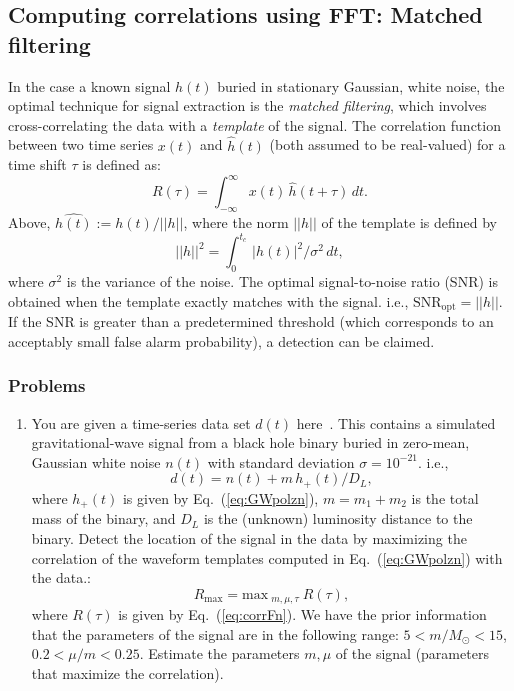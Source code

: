 \subsection{Computing correlations using FFT: Matched filtering}
In the case a known signal $h(t)$ buried in stationary Gaussian, white noise, the optimal technique for 
signal extraction is the \emph{matched filtering}, which involves cross-correlating the data 
with a \emph{template} of the signal. The correlation function between two time series $x(t)$ and $\hat h(t)$ (both assumed to be real-valued) for a time shift 
$\tau$ is defined as:
\begin{equation}
\label{eq:corrFn}
R(\tau) = \int_{-\infty}^{\infty}x(t)\,\hat{h}(t+\tau)\,dt. 
\end{equation}
Above, $\hat{h(t)} := h(t) / ||h||$, where the norm $||h||$
of the template is defined by $$||h||^2 = \int_{0}^{t_c} \, |h(t)|^2/\sigma^2 \, dt,$$ where 
$\sigma^2$ is the variance of the noise. 
The optimal signal-to-noise ratio (SNR) is obtained when the template exactly matches with the signal. i.e., $\mathrm{SNR}_\mathrm{opt} = ||h||$. 
If the SNR is greater than a predetermined threshold (which corresponds to an acceptably small false alarm 
probability), a detection can be claimed. 

\subsubsection{Problems}
\begin{enumerate}
\item You are given a time-series data set $d(t)$ here~\cite{mock-gw-data}. This contains a simulated gravitational-wave signal from a black hole binary buried in zero-mean, Gaussian white noise $n(t)$ with standard deviation $\sigma = 10^{-21}$. i.e.,
\begin{equation}
d(t) = n(t) + m \, h_+(t) / D_L,
\end{equation}
where $h_+(t)$ is given by Eq.~(\ref{eq:GWpolzn}), $m = m_1 + m_2$ is the total mass of the binary, and $D_L$ is the (unknown) luminosity distance to the binary.  Detect the location of the signal in the data by maximizing the correlation of the waveform templates computed in Eq.~(\ref{eq:GWpolzn}) with the data.: 
\begin{equation}
R_\mathrm{max} = \mathrm{max}~_{m,\mu,\tau}~ R(\tau),
\end{equation}
where $R(\tau)$ is given by Eq.~(\ref{eq:corrFn}). We have the prior information that the parameters of the signal are in the following range: $5 < m/M_\odot < 15$, $0.2 < \mu/m < 0.25$. Estimate the parameters $m,\mu$ of the signal (parameters that maximize the correlation). 

\end{enumerate}

